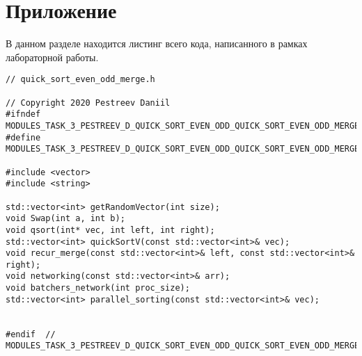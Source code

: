 \documentclass{report}
\begin{document}
\section*{Приложение}
В данном разделе находится листинг всего кода, написанного в рамках лабораторной работы.
\begin{lstlisting}
// quick_sort_even_odd_merge.h

// Copyright 2020 Pestreev Daniil
#ifndef MODULES_TASK_3_PESTREEV_D_QUICK_SORT_EVEN_ODD_QUICK_SORT_EVEN_ODD_MERGE_H_
#define MODULES_TASK_3_PESTREEV_D_QUICK_SORT_EVEN_ODD_QUICK_SORT_EVEN_ODD_MERGE_H_

#include <vector>
#include <string>

std::vector<int> getRandomVector(int size);
void Swap(int a, int b);
void qsort(int* vec, int left, int right);
std::vector<int> quickSortV(const std::vector<int>& vec);
void recur_merge(const std::vector<int>& left, const std::vector<int>& right);
void networking(const std::vector<int>& arr);
void batchers_network(int proc_size);
std::vector<int> parallel_sorting(const std::vector<int>& vec);


#endif  // MODULES_TASK_3_PESTREEV_D_QUICK_SORT_EVEN_ODD_QUICK_SORT_EVEN_ODD_MERGE_H_

\end{lstlisting}
\end{document}
